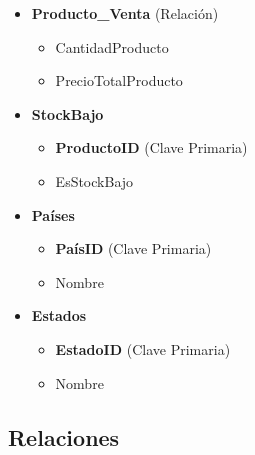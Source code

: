 \documentclass[10pt,openany]{book}
\begin{document}
\begin{itemize}
    \item \textbf{Producto\_Venta} (Relación)
        \begin{itemize}
            \item CantidadProducto
            \item PrecioTotalProducto
        \end{itemize}
        
    \item \textbf{StockBajo}
        \begin{itemize}
            \item \textbf{ProductoID} (Clave Primaria)
            \item EsStockBajo
        \end{itemize}
        
    \item \textbf{Países}
        \begin{itemize}
            \item \textbf{PaísID} (Clave Primaria)
            \item Nombre
        \end{itemize}
        
    \item \textbf{Estados}
        \begin{itemize}
            \item \textbf{EstadoID} (Clave Primaria)
            \item Nombre
        \end{itemize}
\end{itemize}


\subsection{Relaciones}
\end{document}
